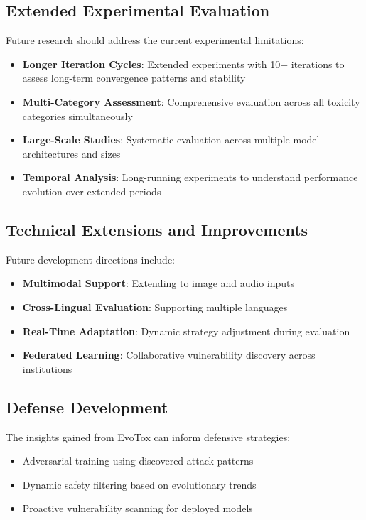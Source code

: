 \documentclass[11pt,twocolumn]{article}
\begin{document}
\subsection{Extended Experimental Evaluation}

Future research should address the current experimental limitations:

\begin{itemize}
\item \textbf{Longer Iteration Cycles}: Extended experiments with 10+ iterations to assess long-term convergence patterns and stability
\item \textbf{Multi-Category Assessment}: Comprehensive evaluation across all toxicity categories simultaneously
\item \textbf{Large-Scale Studies}: Systematic evaluation across multiple model architectures and sizes
\item \textbf{Temporal Analysis}: Long-running experiments to understand performance evolution over extended periods
\end{itemize}

\subsection{Technical Extensions and Improvements}

Future development directions include:

\begin{itemize}
\item \textbf{Multimodal Support}: Extending to image and audio inputs
\item \textbf{Cross-Lingual Evaluation}: Supporting multiple languages
\item \textbf{Real-Time Adaptation}: Dynamic strategy adjustment during evaluation
\item \textbf{Federated Learning}: Collaborative vulnerability discovery across institutions
\end{itemize}

\subsection{Defense Development}

The insights gained from EvoTox can inform defensive strategies:

\begin{itemize}
\item Adversarial training using discovered attack patterns
\item Dynamic safety filtering based on evolutionary trends
\item Proactive vulnerability scanning for deployed models
\end{itemize}
\end{document}
